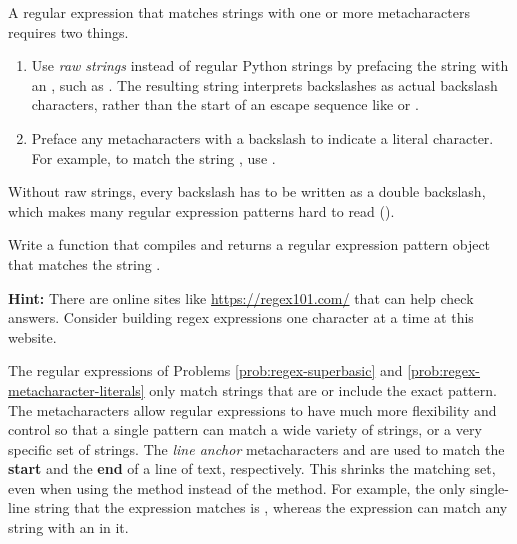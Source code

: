 A regular expression that matches strings with one or more metacharacters  requires two things.
\begin{enumerate}
    \item Use \emph{raw strings} instead of regular Python strings by prefacing the string with an , such as .
The resulting string interprets backslashes as actual backslash characters, rather than the start of an escape sequence like \li{\\n} or \li{\\t}.
    \item Preface any metacharacters with a backslash to indicate a literal character.
For example, to match the string , use .

\end{enumerate}
Without raw strings, every backslash has to be written as a double backslash, which makes many regular expression patterns hard to read ().

\begin{problem}
Write a function that compiles and returns a regular expression pattern object that matches the string .

\textbf{Hint:} There are online sites like \url{https://regex101.com/} that can help check answers. Consider building regex expressions one character at a time at this website.
\label{prob:regex-metacharacter-literals}
\end{problem}

The regular expressions of Problems \ref{prob:regex-superbasic} and
\ref{prob:regex-metacharacter-literals} only match strings that are or include the exact pattern.
The metacharacters allow regular expressions to have much more flexibility and control so that a single pattern can match a wide variety of strings, or a very specific set of strings.
The \emph{line anchor} metacharacters \li{^} and \li{\$} are used to match the \textbf{start} and the \textbf{end} of a line of text, respectively.
This shrinks the matching set, even when using the  method instead of the  method.
For example, the only single-line string that the expression  matches is , whereas the expression  can match any string with an  in it.

